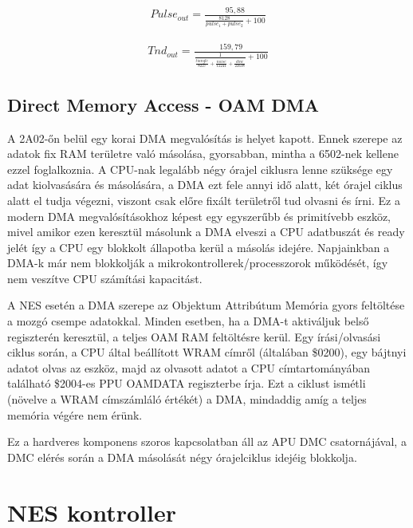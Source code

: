 	\begin{align}
		\label{mat:APU-nonlin-2}
		Pulse_{out} = \frac{95,88}{\frac{8128}{pulse_1 + pulse_2} + 100}
	\end{align}
	
	\begin{align}
		\label{mat:APU-nonlin-3}
		Tnd_{out} = \frac{159,79}{\frac{1}{\frac{tiangle}{8227} + \frac{noise}{12241} + \frac{dmc}{22638}} + 100}
	\end{align}

	\subsection{Direct Memory Access - OAM DMA}
	\label{sec:DMA}
	
	A 2A02-őn belül egy korai DMA megvalósítás is helyet kapott. Ennek szerepe az adatok fix RAM területre való másolása, gyorsabban, mintha a 6502-nek kellene ezzel foglalkoznia. A CPU-nak legalább négy órajel ciklusra lenne szüksége egy adat kiolvasására és másolására, a DMA ezt fele annyi idő alatt, két órajel ciklus alatt el tudja végezni, viszont csak előre fixált területről tud olvasni és írni. Ez a modern DMA megvalósításokhoz képest egy egyszerűbb és primitívebb eszköz, mivel amikor ezen keresztül másolunk a DMA elveszi a CPU adatbuszát és ready jelét így a CPU egy blokkolt állapotba  kerül a másolás idejére. Napjainkban a DMA-k már nem blokkolják a mikrokontrollerek/processzorok működését, így nem veszítve CPU számítási kapacitást.
	
	A NES esetén a DMA szerepe az Objektum Attribútum Memória gyors feltöltése a mozgó csempe adatokkal. Minden esetben, ha a DMA-t aktiváljuk belső regiszterén keresztül, a teljes OAM RAM feltöltésre kerül. Egy írási/olvasási ciklus során, a CPU által beállított WRAM címről (általában \$0200), egy bájtnyi adatot olvas az eszköz, majd az olvasott adatot a CPU címtartományában található \$2004-es PPU OAMDATA regiszterbe írja. Ezt a ciklust ismétli (növelve a WRAM címszámláló értékét) a DMA, mindaddig amíg a teljes memória végére nem érünk.
	
	Ez a hardveres komponens szoros kapcsolatban áll az APU DMC csatornájával, a DMC elérés során a DMA másolását négy órajelciklus idejéig blokkolja.  
	
\section{NES kontroller}
\label{sec:NES-controller}

